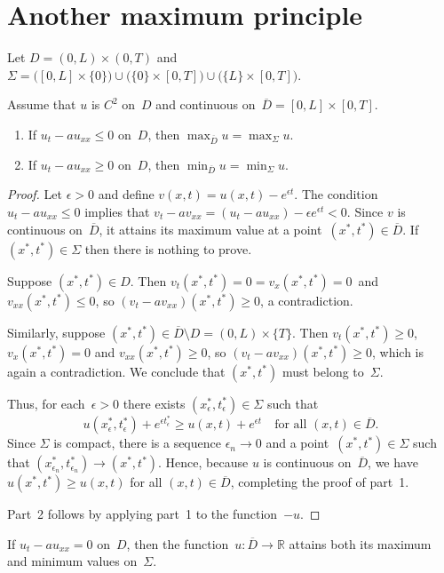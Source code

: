 \section{Another maximum principle}

Let $D=(0,L)\times(0,T)$ and
$\Sigma=\bigl([0,L]\times\{0\})\cup\bigl(\{0\}\times[0,T]\bigr)\cup
\bigl(\{L\}\times[0,T]\bigr)$.

\begin{theorem}
Assume that $u$ is $C^2$ on~$D$ and continuous
on~$\overline{D}=[0,L]\times[0,T]$.
\begin{enumerate}
\item If $u_t-au_{xx}\le0$ on~$D$, then $\max_{\overline{D}}u=\max_\Sigma u$.
\item If $u_t-au_{xx}\ge0$ on~$D$, then $\min_{\overline{D}}u=\min_\Sigma u$.
\end{enumerate}
\end{theorem}
\begin{proof}
Let $\epsilon>0$ and define $v(x,t)=u(x,t)-e^{\epsilon t}$.  The condition
$u_t-au_{xx}\le0$ implies that
$v_t-av_{xx}=(u_t-au_{xx})-\epsilon e^{\epsilon t}<0$.  Since $v$ is continuous
on~$\overline{D}$, it attains its maximum value at a
point~$(x^*,t^*)\in\overline{D}$.  If $(x^*,t^*)\in\Sigma$ then there is
nothing to prove.

Suppose $(x^*,t^*)\in D$.  Then $v_t(x^*,t^*)=0=v_x(x^*,t^*)=0$~and
$v_{xx}(x^*,t^*)\le0$, so $(v_t-av_{xx})(x^*,t^*)\ge0$, a contradiction.

Similarly, suppose $(x^*,t^*)\in\overline{D}\setminus D=(0,L)\times\{T\}$.
Then $v_t(x^*,t^*)\ge0$, $v_x(x^*,t^*)=0$ and $v_{xx}(x^*,t^*)\ge0$, so
$(v_t-av_{xx})(x^*,t^*)\ge0$, which is again a contradiction.  We conclude that
$(x^*,t^*)$ must belong to~$\Sigma$.

Thus, for each~$\epsilon>0$ there exists $(x^*_\epsilon,t^*_\epsilon)\in\Sigma$
such that
\[
u(x^*_\epsilon,t^*_\epsilon)+e^{\epsilon t^*_\epsilon}
	\ge u(x,t)+e^{\epsilon t}\quad\text{for all $(x,t)\in\overline{D}$.}
\]
Since $\Sigma$ is compact, there is a sequence $\epsilon_n\to0$ and a
point~$(x^*,t^*)\in\Sigma$ such that
$(x^*_{\epsilon_n},t^*_{\epsilon_n})\to(x^*,t^*)$.  Hence, because $u$ is
continuous on~$\overline{D}$, we have $u(x^*,t^*)\ge u(x,t)$ for all
$(x,t)\in\overline{D}$, completing the proof of part~1.

Part~2 follows by applying part~1 to the function~$-u$.
\end{proof}

\begin{corollary}
If $u_t-au_{xx}=0$ on~$D$, then the function~$u:\overline{D}\to\mathbb{R}$
attains both its maximum and minimum values on~$\Sigma$.
\end{corollary}

